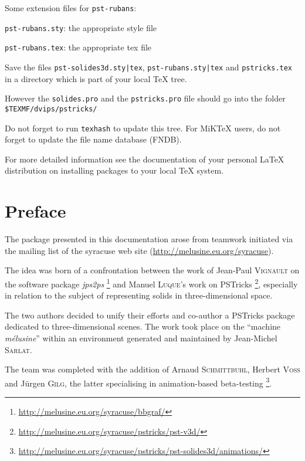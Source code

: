 Some extension files for \texttt{pst-rubans}:
\begin{compactitem}
\item \texttt{pst-rubans.sty}: the appropriate style file
\item \texttt{pst-rubans.tex}: the appropriate tex file
\end{compactitem}

Save the files \texttt{pst-solides3d.sty|tex},
\texttt{pst-rubans.sty|tex} and \texttt{pstricks.tex} in a
directory which is part of your local \TeX{} tree.

However the \texttt{solides.pro} and the \texttt{pstricks.pro} file should go into the
folder \verb+$TEXMF/dvips/pstricks/+  %

Do not forget to run \texttt{texhash} to update this tree. For
MiK\TeX{} users, do not forget to update the file name database
(FNDB).

For more detailed information see the documentation of your
personal \LaTeX{} distribution on installing packages to your
local \TeX{} system.





\section{Preface}

The package presented in this documentation arose from teamwork
initiated via the mailing list of the syracuse web site
(\url{http://melusine.eu.org/syracuse}).

The idea was born of a confrontation between the work of
Jean-Paul \textsc{Vignault} on the software package \textit{jps2ps}%
\footnote{\url{http://melusine.eu.org/syracuse/bbgraf/}}
and Manuel \textsc{Luque}'s work on PSTricks%
\footnote{\url{http://melusine.eu.org/syracuse/pstricks/pst-v3d/}},
especially in relation to the subject of representing solids in
three-dimensional space.

The two authors decided to unify their efforts and co-author a
PSTricks package dedicated to three-dimensional scenes. The work
took place on the ``machine \textit{m\'{e}lusine}'' within an
environment generated and maintained by Jean-Michel
\textsc{Sarlat}.

The team was completed with the addition of Arnaud
\textsc{Schmittbuhl}, Herbert \textsc{Voss}
and J\"{u}rgen \textsc{Gilg}, the latter specialising in animation-based beta-testing%
\footnote{\url{http://melusine.eu.org/syracuse/pstricks/pst-solides3d/animations/}}.


